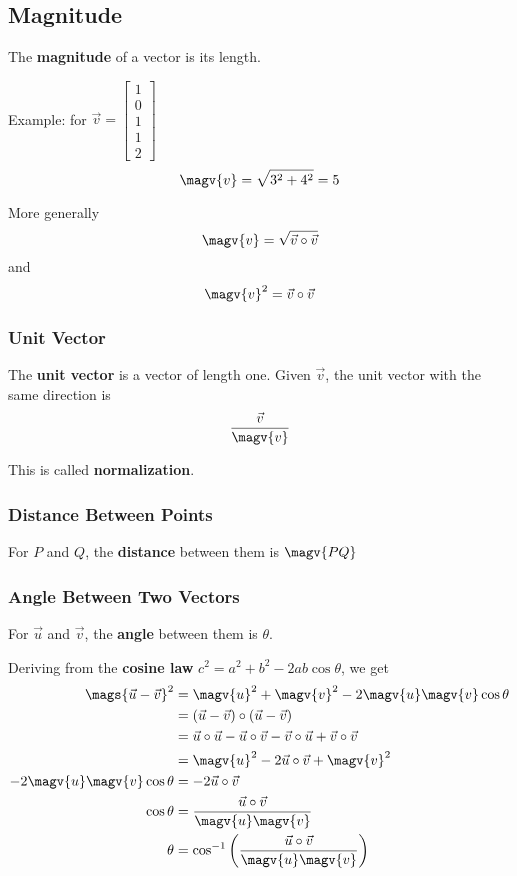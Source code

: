 \documentclass[12pt]{article}
\begin{document}
\subsection*{Magnitude}
The {\bf magnitude} of a vector is its length.

Example: for $\vec{v} = \begin{bmatrix}1\\0\\1\\1\\2\end{bmatrix}$ \[ \magv{v} = \sqrt{3^2+4^2} = 5 \]

More generally \[ \magv{v} = \sqrt{\vec{v}\circ\vec{v}} \] and \[ \magv{v}^2 = \vec{v}\circ\vec{v} \]

\subsubsection*{Unit Vector}
The {\bf unit vector} is a vector of length one. Given $\vec{v}$, the unit vector with the same direction is \[ \frac{\vec{v}}{\magv{v}} \]

This is called {\bf normalization}.

\subsubsection*{Distance Between Points}
For $P$ and $Q$, the {\bf distance} between them is $\magv{PQ}$

\subsubsection*{Angle Between Two Vectors}
For $\vec{u}$ and $\vec{v}$, the {\bf angle} between them is $\theta$.

Deriving from the {\bf cosine law} $c^2 = a^2 + b^2 - 2ab\cos\theta$, we get
\begin{align*}
\mags{\vec{u}-\vec{v}}^2 &= \magv{u}^2 + \magv{v}^2 - 2\magv{u}\magv{v}\cos\theta\\
&= (\vec{u}-\vec{v})\circ(\vec{u}-\vec{v})\\
&= \vec{u}\circ\vec{u} - \vec{u}\circ\vec{v} - \vec{v}\circ\vec{u} + \vec{v}\circ\vec{v}\\
&= \magv{u}^2 - 2\vec{u}\circ\vec{v} + \magv{v}^2\\
-2\magv{u}\magv{v}\cos\theta &= -2\vec{u}\circ\vec{v}\\
\cos{\theta}&=\frac{\vec{u}\circ\vec{v}}{\magv{u}\magv{v}}\\
\theta&=\cos^{-1}\bigg({\frac{\vec{u}\circ\vec{v}}{\magv{u}\magv{v}}}\bigg)
\end{align*}
\end{document}

